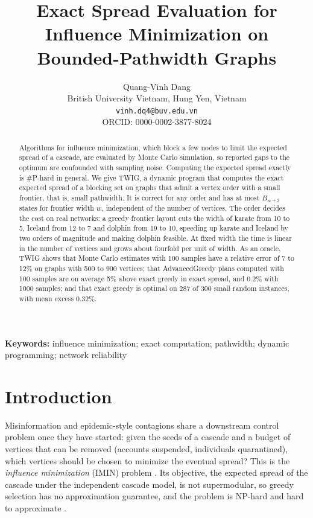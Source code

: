 \documentclass[11pt]{article}
\title{Exact Spread Evaluation for Influence Minimization on Bounded-Pathwidth Graphs}
\author{Quang-Vinh Dang\\ British University Vietnam, Hung Yen, Vietnam\\ \texttt{vinh.dq4@buv.edu.vn}\\ ORCID: 0000-0002-3877-8024}
\date{}
\theoremstyle{definition}
\theoremstyle{remark}
\begin{document}
\maketitle
\begin{abstract}
Algorithms for influence minimization, which block a few nodes to limit the expected spread of a cascade, are evaluated by Monte Carlo simulation, so reported gaps to the optimum are confounded with sampling noise. Computing the expected spread exactly is \#P-hard in general. We give TWIG, a dynamic program that computes the exact expected spread of a blocking set on graphs that admit a vertex order with a small frontier, that is, small pathwidth. It is correct for any order and has at most $B_{w+2}$ states for frontier width $w$, independent of the number of vertices. The order decides the cost on real networks: a greedy frontier layout cuts the width of karate from 10 to 5, Iceland from 12 to 7 and dolphin from 19 to 10, speeding up karate and Iceland by two orders of magnitude and making dolphin feasible. At fixed width the time is linear in the number of vertices and grows about fourfold per unit of width. As an oracle, TWIG shows that Monte Carlo estimates with 100 samples have a relative error of 7 to 12\% on graphs with 500 to 900 vertices; that AdvancedGreedy plans computed with 100 samples are on average 5\% above exact greedy in exact spread, and 0.2\% with 1000 samples; and that exact greedy is optimal on 287 of 300 small random instances, with mean excess 0.32\%.
\end{abstract}
\noindent\textbf{Keywords:} influence minimization; exact computation; pathwidth; dynamic programming; network reliability

\section{Introduction}\label{sec:intro}

Misinformation and epidemic-style contagions share a downstream control problem once they have started: given the seeds of a cascade and a budget of vertices that can be removed (accounts suspended, individuals quarantined), which vertices should be chosen to minimize the eventual spread? This is the \emph{influence minimization} (IMIN) problem \citep{xie2023,xie2024}. Its objective, the expected spread of the cascade under the independent cascade model, is not supermodular, so greedy selection has no approximation guarantee, and the problem is NP-hard and hard to approximate \citep{xie2023}.
\end{document}
